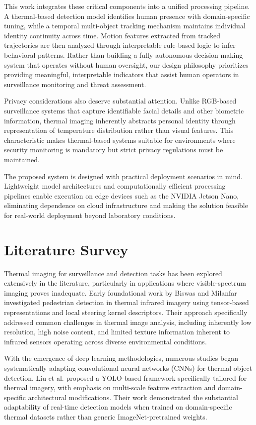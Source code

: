 \documentclass[conference]{IEEEtran}
\begin{document}
This work integrates these critical components into a unified processing pipeline. A thermal-based detection model identifies human presence with domain-specific tuning, while a temporal multi-object tracking mechanism maintains individual identity continuity across time. Motion features extracted from tracked trajectories are then analyzed through interpretable rule-based logic to infer behavioral patterns. Rather than building a fully autonomous decision-making system that operates without human oversight, our design philosophy prioritizes providing meaningful, interpretable indicators that assist human operators in surveillance monitoring and threat assessment.

Privacy considerations also deserve substantial attention. Unlike RGB-based surveillance systems that capture identifiable facial details and other biometric information, thermal imaging inherently abstracts personal identity through representation of temperature distribution rather than visual features. This characteristic makes thermal-based systems suitable for environments where security monitoring is mandatory but strict privacy regulations must be maintained.

The proposed system is designed with practical deployment scenarios in mind. Lightweight model architectures and computationally efficient processing pipelines enable execution on edge devices such as the NVIDIA Jetson Nano, eliminating dependence on cloud infrastructure and making the solution feasible for real-world deployment beyond laboratory conditions.

\section{Literature Survey}

Thermal imaging for surveillance and detection tasks has been explored extensively in the literature, particularly in applications where visible-spectrum imaging proves inadequate. Early foundational work by Biswas and Milanfar \cite{ref6} investigated pedestrian detection in thermal infrared imagery using tensor-based representations and local steering kernel descriptors. Their approach specifically addressed common challenges in thermal image analysis, including inherently low resolution, high noise content, and limited texture information inherent to infrared sensors operating across diverse environmental conditions.

With the emergence of deep learning methodologies, numerous studies began systematically adapting convolutional neural networks (CNNs) for thermal object detection. Liu et al. \cite{ref2} proposed a YOLO-based framework specifically tailored for thermal imagery, with emphasis on multi-scale feature extraction and domain-specific architectural modifications. Their work demonstrated the substantial adaptability of real-time detection models when trained on domain-specific thermal datasets rather than generic ImageNet-pretrained weights.
\end{document}
